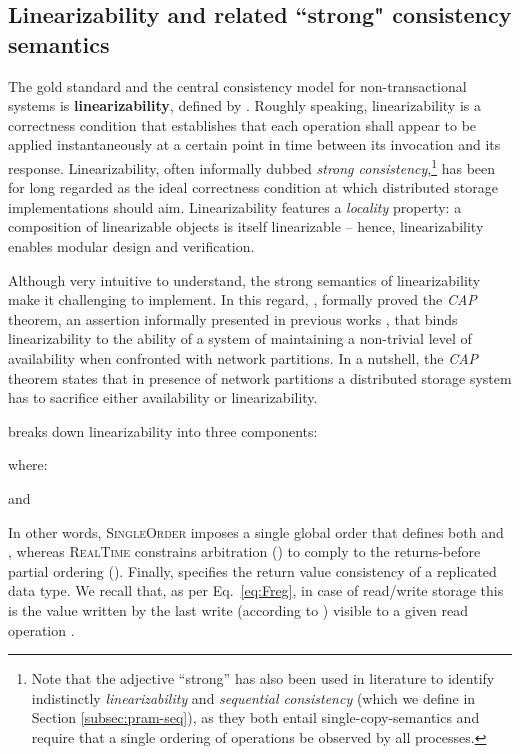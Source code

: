 \documentclass[letter, 11pt]{article}
\newcommand{\citeN}{\citet}
\renewcommand{\cite}{\citep}
\begin{document}
\subsection{Linearizability and related ``strong" consistency semantics}
\label{subsec:lin}
The gold standard and the central consistency model for non-transactional systems is \textbf{linearizability}, defined by \citeN{Herlihy.Wing:90}. Roughly speaking, linearizability is a correctness condition that 
establishes that each operation shall appear to be applied instantaneously 
at a certain point in time between its invocation and its response.
Linearizability, often informally dubbed \emph{strong consistency},\footnote{Note that the adjective ``strong'' 
	has also been used in literature to identify indistinctly 
	\emph{linearizability} and \emph{sequential consistency} 
	(which we define in Section \ref{subsec:pram-seq}), 
	as they both entail single-copy-semantics 
	and require that a single ordering of operations be observed by all processes.}
has been for long regarded as the ideal 
correctness condition at which distributed storage implementations should aim.
Linearizability features a
\emph{locality} property: a composition of linearizable objects is itself linearizable -- hence, linearizability enables modular design and verification. 

Although very intuitive to understand, the strong semantics of linearizability make it challenging to implement. 
In this regard, \citeN{Gilbert.Lynch:02}, formally proved the \emph{CAP} theorem, an assertion informally presented in previous works \cite{RFC0677,Davidson.Garcia-Molina.ea:85,Coan.ea:86,Brewer:00}, that binds linearizability to the ability of a system of maintaining a non-trivial level of availability when confronted with network partitions.
In a nutshell, the \emph{CAP} theorem states that in presence of network partitions a distributed storage system has to sacrifice either availability or linearizability.

\citeN{Burckhardt:14} breaks down linearizability into three components:

where:

and

In other words, \textsc{SingleOrder} imposes a single global order that defines both  and ,
whereas \textsc{RealTime} constrains arbitration () to comply to the returns-before partial ordering (). Finally,  specifies the return value consistency of a replicated data type. We recall that, as per Eq.~\ref{eq:Freg}, in case of read/write storage this is the value written by the last write (according to ) visible to a given read operation . 
\end{document}
